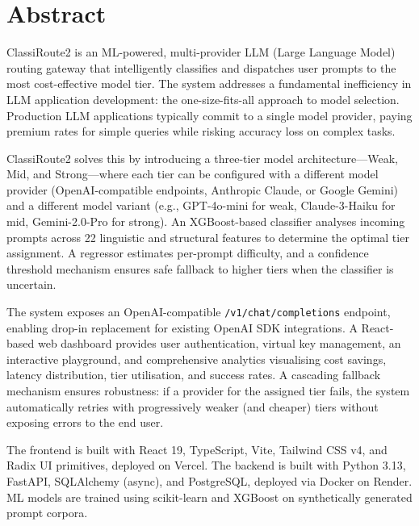 \documentclass[12pt,a4paper]{report}
\begin{document}
\chapter*{Abstract}

ClassiRoute2 is an ML-powered, multi-provider LLM (Large Language Model) routing gateway that intelligently classifies and dispatches user prompts to the most cost-effective model tier. The system addresses a fundamental inefficiency in LLM application development: the one-size-fits-all approach to model selection. Production LLM applications typically commit to a single model provider, paying premium rates for simple queries while risking accuracy loss on complex tasks.

ClassiRoute2 solves this by introducing a three-tier model architecture---Weak, Mid, and Strong---where each tier can be configured with a different model provider (OpenAI-compatible endpoints, Anthropic Claude, or Google Gemini) and a different model variant (e.g., GPT-4o-mini for weak, Claude-3-Haiku for mid, Gemini-2.0-Pro for strong). An XGBoost-based classifier analyses incoming prompts across 22 linguistic and structural features to determine the optimal tier assignment. A regressor estimates per-prompt difficulty, and a confidence threshold mechanism ensures safe fallback to higher tiers when the classifier is uncertain.

The system exposes an OpenAI-compatible \texttt{/v1/chat/completions} endpoint, enabling drop-in replacement for existing OpenAI SDK integrations. A React-based web dashboard provides user authentication, virtual key management, an interactive playground, and comprehensive analytics visualising cost savings, latency distribution, tier utilisation, and success rates. A cascading fallback mechanism ensures robustness: if a provider for the assigned tier fails, the system automatically retries with progressively weaker (and cheaper) tiers without exposing errors to the end user.

The frontend is built with React 19, TypeScript, Vite, Tailwind CSS v4, and Radix UI primitives, deployed on Vercel. The backend is built with Python 3.13, FastAPI, SQLAlchemy (async), and PostgreSQL, deployed via Docker on Render. ML models are trained using scikit-learn and XGBoost on synthetically generated prompt corpora.

\end{document}
